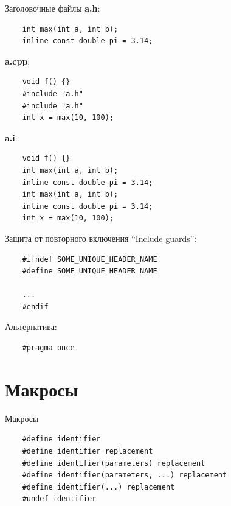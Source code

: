 \documentclass[unknownkeysallowed,xcolor=table]{beamer}
\begin{document}
\begin{frame}[fragile]{Заголовочные файлы}
  \textbf{a.h}:
  \begin{lstlisting}
    int max(int a, int b);
    inline const double pi = 3.14;
  \end{lstlisting}

  \vspace{0.5em}

  \textbf{a.cpp}:
  \begin{lstlisting}
    void f() {}
    #include "a.h"
    #include "a.h"
    int x = max(10, 100);
  \end{lstlisting}

  \vspace{0.5em}

  \textbf{a.i}:
  \begin{lstlisting}
    void f() {}
    int max(int a, int b);
    inline const double pi = 3.14;
    int max(int a, int b);
    inline const double pi = 3.14;
    int x = max(10, 100);
  \end{lstlisting}
\end{frame}

\begin{frame}[fragile]{Защита от повторного включения}
  ``Include guards'':
  \begin{lstlisting}
    #ifndef SOME_UNIQUE_HEADER_NAME
    #define SOME_UNIQUE_HEADER_NAME

    ...
    #endif
  \end{lstlisting}

  \vspace{2em}

  Альтернатива:
  \begin{lstlisting}
    #pragma once
  \end{lstlisting}
\end{frame}

\section{Макросы}

\begin{frame}[fragile]{Макросы}
  \begin{lstlisting}
    #define identifier
    #define identifier replacement
    #define identifier(parameters) replacement
    #define identifier(parameters, ...) replacement
    #define identifier(...) replacement
    #undef identifier
  \end{lstlisting}
\end{frame}
\end{document}
